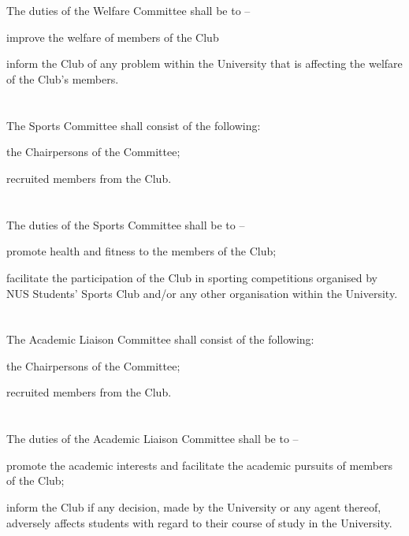 \section{}
The duties of the Welfare Committee shall be to –
	\begin{legal}
	\item improve the welfare of members of the Club
	\item inform the Club of any problem within the University that is affecting the welfare of the Club's members.
	\end{legal}

\section{}
The Sports Committee shall consist of the following:
	\begin{legal}
	\item the Chairpersons of the Committee;
	\item recruited members from the Club.
	\end{legal}

\section{}
The duties of the Sports Committee shall be to –
	\begin{legal}
	\item promote health and fitness to the members of the Club;
	\item facilitate the participation of the Club in sporting competitions organised by NUS Students' Sports Club and/or any other organisation within the University.
	\end{legal}

\section{}
The Academic Liaison Committee shall consist of the following:
	\begin{legal}
	\item the Chairpersons of the Committee;
	\item recruited members from the Club.
	\end{legal}

\section{}
The duties of the Academic Liaison Committee shall be to –
	\begin{legal}
	\item promote the academic interests and facilitate the academic pursuits of members of the Club;
	\item inform the Club if any decision, made by the University or any agent thereof, adversely affects students with regard to their course of study in the University.
	\end{legal}
